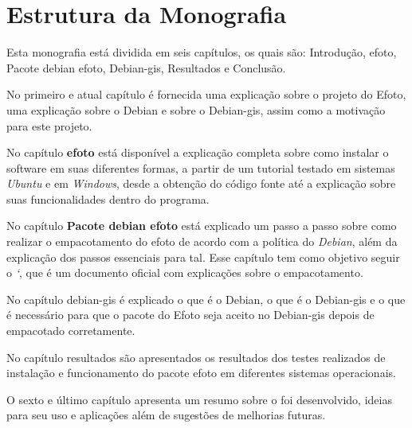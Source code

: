 \section*{Estrutura da Monografia}

Esta monografia está dividida em seis capítulos, os quais são: Introdução, efoto, Pacote debian efoto, Debian-gis, Resultados e Conclusão.

No primeiro e atual capítulo é fornecida uma explicação sobre o projeto do Efoto, uma explicação sobre o Debian e sobre o Debian-gis, assim como a motivação para este projeto.

No capítulo \textbf{efoto} está disponível a explicação completa sobre como instalar o software em suas diferentes formas, a partir de um tutorial testado em sistemas \textit{Ubuntu} e em \textit{Windows}, desde a obtenção do código fonte até a explicação sobre suas funcionalidades dentro do programa.

No capítulo \textbf{Pacote debian efoto} está explicado um passo a passo sobre como realizar o empacotamento do efoto de acordo com a política do \textit{Debian}, além da explicação dos passos essenciais para tal. Esse capítulo tem como objetivo seguir o \textit{`}, que é um documento oficial com explicações sobre o empacotamento.

No capítulo debian-gis é explicado o que é o Debian, o que é o Debian-gis e o que é necessário para que o pacote do Efoto seja aceito no Debian-gis depois de empacotado corretamente.

No capítulo resultados são apresentados os resultados dos testes realizados de instalação e funcionamento do pacote efoto em diferentes sistemas operacionais.

O sexto e último capítulo apresenta um resumo sobre o foi desenvolvido, ideias para seu uso e aplicações além de sugestões de melhorias futuras.

 